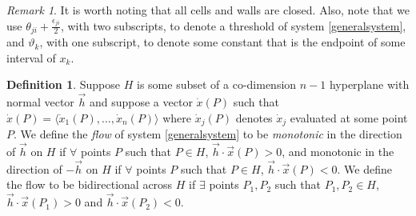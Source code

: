 \documentclass[12pt]{article}
\theoremstyle{definition}
\newtheorem{defn}{Definition}[section]
\theoremstyle{remark}
\newtheorem{remark}{Remark}[section]
\newcommand{\bbR}{\mathbb{R}} %
\newcommand{\bbP}{\mathbb{P}}
\begin{document}
\begin{remark}
It is worth noting that all cells and walls are closed. Also, note that we use $\theta_{ji}+\frac{\epsilon_{ji}}{2}$, with two subscripts, to denote a threshold of system \eqref{generalsystem}, and $\vartheta_k$, with one subscript, to denote some constant that is the endpoint of some interval of $x_k$.
\end{remark}


\begin{defn} \label{flowDefn}
Suppose $H$ is some subset of a co-dimension $n-1$ hyperplane with normal vector $\vec{h}$ and suppose a vector $\dot{x}(P)$ such that $\dot{x}(P)=\langle \dot{x}_1(P),\dots,\dot{x}_n(P) \rangle$ where $\dot{x}_j(P)$ denotes $\dot{x}_j$ evaluated at some point $P$. We define the \textit{flow} of system \eqref{generalsystem} to be \textit{monotonic} in the direction of $\vec{h}$ on $H$ if $\forall$ points $P$ such that $P\in H$, $\vec{h}\cdot\vec{x}(P)>0$, and monotonic in the direction of $-\vec{h}$ on $H$ if $\forall$ points $P$ such that $P\in H$, $\vec{h}\cdot\vec{x}(P)<0$. 
We define the flow to be bidirectional across $H$ if $\exists$ points $P_1,P_2$ such that $P_1,P_2 \in H$, $\vec{h}\cdot\vec{x}(P_1)>0$ and $\vec{h}\cdot\vec{x}(P_2)<0$.
\end{defn}
\end{document}
